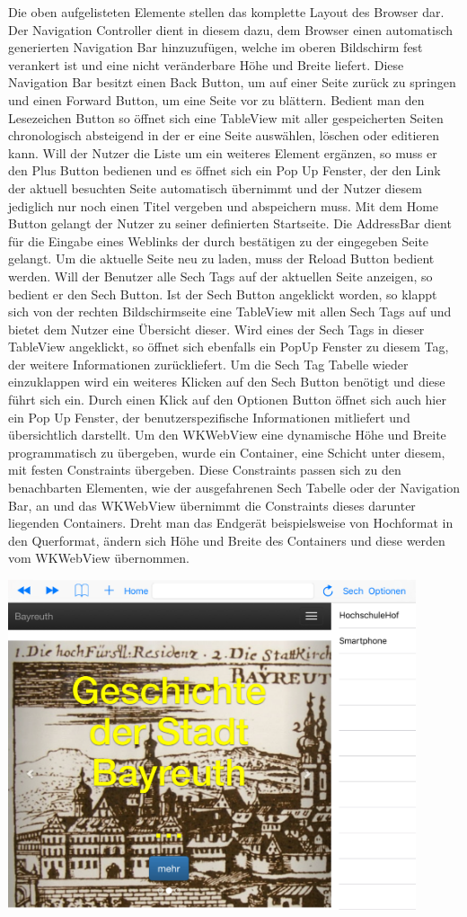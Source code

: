 Die oben aufgelisteten Elemente stellen das komplette Layout des Browser dar. Der Navigation Controller dient in diesem dazu, dem Browser einen automatisch generierten Navigation Bar hinzuzufügen, welche im oberen Bildschirm fest verankert ist und eine nicht veränderbare Höhe und Breite liefert. Diese Navigation Bar besitzt einen Back Button, um auf einer Seite zurück zu springen und einen Forward Button, um eine Seite vor zu blättern. Bedient man den Lesezeichen Button so öffnet sich eine TableView mit aller gespeicherten Seiten chronologisch absteigend in der er eine Seite auswählen, löschen oder editieren kann. Will der Nutzer die Liste um ein weiteres Element ergänzen, so muss er den Plus Button bedienen und es öffnet sich ein Pop Up Fenster, der den Link der aktuell besuchten Seite automatisch übernimmt und der Nutzer diesem jediglich nur noch einen Titel vergeben und abspeichern muss. Mit dem Home Button gelangt der Nutzer zu seiner definierten Startseite. Die AddressBar dient für die Eingabe eines Weblinks der durch bestätigen zu der eingegeben Seite gelangt. Um die aktuelle Seite neu zu laden, muss der Reload Button bedient werden. Will der Benutzer alle Sech Tags auf der aktuellen Seite anzeigen, so bedient er den Sech Button. Ist der Sech Button angeklickt worden, so klappt sich von der rechten Bildschirmseite eine TableView mit allen Sech Tags auf und bietet dem Nutzer eine Übersicht dieser. Wird eines der Sech Tags in dieser TableView angeklickt, so öffnet sich ebenfalls ein PopUp Fenster zu diesem Tag, der weitere Informationen zurückliefert. Um die Sech Tag Tabelle wieder einzuklappen wird ein weiteres Klicken auf den Sech Button benötigt und diese führt sich ein. Durch einen Klick auf den Optionen Button öffnet sich auch hier ein Pop Up Fenster, der benutzerspezifische Informationen mitliefert und übersichtlich darstellt. Um den WKWebView eine dynamische Höhe und Breite programmatisch zu übergeben, wurde ein Container, eine Schicht unter diesem, mit festen Constraints übergeben. Diese Constraints passen sich zu den benachbarten Elementen, wie der ausgefahrenen Sech Tabelle oder der Navigation Bar, an und das WKWebView übernimmt die Constraints dieses darunter liegenden Containers. Dreht man das Endgerät beispielsweise von Hochformat in den Querformat, ändern sich Höhe und Breite des Containers und diese werden vom WKWebView übernommen.

\includegraphics[width=12cm]{Pics/Browser_Hochformat}


